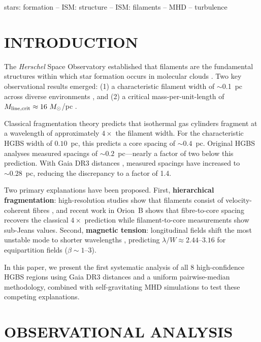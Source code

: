 \documentclass[twoside,twocolumn]{mnras}
\begin{document}
\begin{keywords}
stars: formation -- ISM: structure -- ISM: filaments -- MHD -- turbulence
\end{keywords}

\section{INTRODUCTION}

The \textit{Herschel} Space Observatory established that filaments are the fundamental
structures within which star formation occurs in molecular clouds \citep{Andre2010}.
Two key observational results emerged: (1) a characteristic filament width of $\sim$0.1~pc
across diverse environments \citep{Arzoumanian2011}, and (2) a critical mass-per-unit-length
of $M_{\rm line,crit} \approx 16~M_\odot$/pc \citep{Ostriker1964}.

Classical fragmentation theory \citep{Inutsuka1992} predicts that isothermal gas cylinders
fragment at a wavelength of approximately $4\times$ the filament width. For the
characteristic HGBS width of $0.10$~pc, this predicts a core spacing of $\sim 0.4$~pc.
Original HGBS analyses measured spacings of $\sim 0.2$~pc---nearly a factor of two below
this prediction. With Gaia DR3 distances \citep{Zhang2023}, measured spacings have
increased to $\sim 0.28$~pc, reducing the discrepancy to a factor of 1.4.

Two primary explanations have been proposed. First, \textbf{hierarchical fragmentation}:
high-resolution studies show that filaments consist of velocity-coherent fibres
\citep{Hacar2013}, and recent work in Orion~B \citep{Yang2024} shows that fibre-to-core
spacing recovers the classical $4\times$ prediction while filament-to-core measurements
show sub-Jeans values. Second, \textbf{magnetic tension}: longitudinal fields shift the
most unstable mode to shorter wavelengths \citep{Nakamura1993}, predicting
$\lambda/W \approx 2.44$--$3.16$ for equipartition fields ($\beta \sim 1$--$3$).

In this paper, we present the first systematic analysis of all 8 high-confidence HGBS regions using Gaia DR3 distances and a uniform pairwise-median methodology, combined with self-gravitating MHD simulations to test these competing
explanations.

\section{OBSERVATIONAL ANALYSIS}
\end{document}
